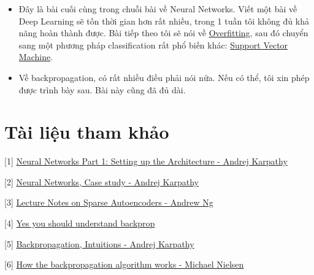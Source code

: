 \begin{itemize}
    \item Đây là bài cuối cùng trong chuỗi bài về Neural Networks. Viết một bài về Deep Learning sẽ tốn thời gian hơn rất nhiều, trong 1 tuần tôi không đủ khả năng hoàn thành được. Bài tiếp theo tôi sẽ nói về \href{https://en.wikipedia.org/wiki/Overfitting}{Overfitting}, sau đó chuyển sang một phương pháp classification rất phổ biến khác: \href{https://en.wikipedia.org/wiki/Support_vector_machine}{Support Vector Machine}. 
     
    \item Về backpropagation, có rất nhiều điều phải nói nữa. Nếu có thể, tôi xin phép được trình bày sau. Bài này cũng đã đủ dài. 
 
\end{itemize}
 
 
\section{Tài liệu tham khảo}
 
[1] \href{http://cs231n.github.io/neural-networks-1/}{Neural Networks Part 1: Setting up the Architecture - Andrej Karpathy} 
 
[2] \href{http://cs231n.github.io/neural-networks-case-study/}{Neural Networks, Case study - Andrej Karpathy} 
 
[3] \href{https://web.stanford.edu/class/cs294a/sparseAutoencoder_2011new.pdf}{Lecture Notes on Sparse Autoencoders - Andrew Ng} 
 
[4] \href{https://medium.com/@karpathy/yes-you-should-understand-backprop-e2f06eab496b#.g76s9xxzc}{Yes you should understand backprop} 
 
[5] \href{http://cs231n.github.io/optimization-2/}{Backpropagation, Intuitions - Andrej Karpathy} 
 
[6] \href{http://neuralnetworksanddeeplearning.com/chap2.html}{How the backpropagation algorithm works - Michael Nielsen } 
